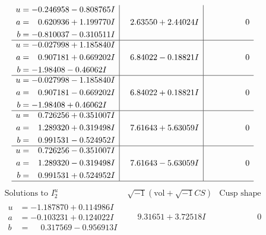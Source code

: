 \documentclass[1p]{elsarticle_modified}
\theoremstyle{definition}
\newcommand{\I}{\sqrt{-1}}
\begin{document}
$$\begin{array}{c|c|c}
\begin{aligned}
u &= -0.246958 - 0.808765 I \\
a &= \phantom{-}0.620936 + 1.199770 I \\
b &= -0.810037 - 0.310511 I\end{aligned}
 & \phantom{-}2.63550 + 2.44024 I & \phantom{-0.000000 } 0 \\ \hline\begin{aligned}
u &= -0.027998 + 1.185840 I \\
a &= \phantom{-}0.907181 + 0.669202 I \\
b &= -1.98408 - 0.46062 I\end{aligned}
 & \phantom{-}6.84022 - 0.18821 I & \phantom{-0.000000 } 0 \\ \hline\begin{aligned}
u &= -0.027998 - 1.185840 I \\
a &= \phantom{-}0.907181 - 0.669202 I \\
b &= -1.98408 + 0.46062 I\end{aligned}
 & \phantom{-}6.84022 + 0.18821 I & \phantom{-0.000000 } 0 \\ \hline\begin{aligned}
u &= \phantom{-}0.726256 + 0.351007 I \\
a &= \phantom{-}1.289320 + 0.319498 I \\
b &= \phantom{-}0.991531 - 0.524952 I\end{aligned}
 & \phantom{-}7.61643 + 5.63059 I & \phantom{-0.000000 } 0 \\ \hline\begin{aligned}
u &= \phantom{-}0.726256 - 0.351007 I \\
a &= \phantom{-}1.289320 - 0.319498 I \\
b &= \phantom{-}0.991531 + 0.524952 I\end{aligned}
 & \phantom{-}7.61643 - 5.63059 I & \phantom{-0.000000 } 0\\
 \hline 
 \end{array}$$\newpage$$\begin{array}{c|c|c}  
\text{Solutions to }I^u_{2}& \I (\text{vol} + \sqrt{-1}CS) & \text{Cusp shape}\\
 \hline 
\begin{aligned}
u &= -1.187870 + 0.114986 I \\
a &= -0.103231 + 0.124022 I \\
b &= \phantom{-}0.317569 - 0.956913 I\end{aligned}
 & \phantom{-}9.31651 + 3.72518 I & \phantom{-0.000000 } 0 \\ \hline\begin{aligned}

\end{aligned}
\end{array}$$
\end{document}
